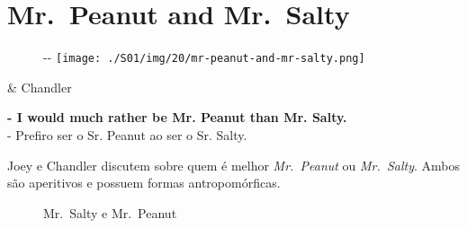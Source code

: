 \hypertarget{mr.-peanut-and-mr.-salty}{%
\section{Mr.~Peanut and Mr.~Salty}\label{mr.-peanut-and-mr.-salty}}

\begin{figure}[!ht]
  \begin{adjustwidth}{-\oddsidemargin-1in}{-\rightmargin}
    \centering
    \texttt{[image: ./S01/img/20/mr-peanut-and-mr-salty.png]}
  \end{adjustwidth}
\end{figure}

\begin{tcolorbox}[enhanced,center upper,
    drop fuzzy shadow southeast, boxrule=0.3pt,
    lower separated=false, breakable,
    colframe=black!30!dialogoBorder,colback=white]
\begin{minipage}[c]{0.16\linewidth}
   & \centering \scriptsize{Chandler}
\end{minipage}
\hfill
\begin{minipage}[c]{0.8\linewidth}
  \textbf{- I would much rather be Mr. Peanut than Mr. Salty.}\\
  - Prefiro ser o Sr. Peanut ao ser o Sr. Salty.
\end{minipage}
\end{tcolorbox}

Joey e Chandler discutem sobre quem é melhor \emph{Mr.~Peanut} ou
\emph{Mr.~Salty}. Ambos são aperitivos e possuem formas antropomórficas.

\begin{figure}
  \centering
    \caption{Mr. Salty e Mr. Peanut\label{fig:mr-salty-e-mr-peanut}}
\end{figure}


